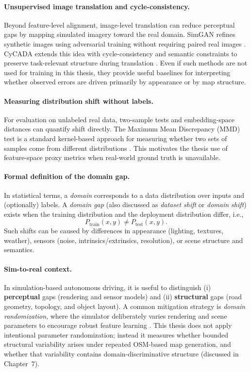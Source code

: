 \paragraph{Unsupervised image translation and cycle-consistency.}
Beyond feature-level alignment, image-level translation can reduce perceptual gaps by mapping simulated imagery toward the real domain.
SimGAN refines synthetic images using adversarial training without requiring paired real images \cite{shrivastava2017simgan}.
CyCADA extends this idea with cycle-consistency and semantic constraints to preserve task-relevant structure during translation \cite{hoffman2018cycada}.
Even if such methods are not used for training in this thesis, they provide useful baselines for interpreting whether observed errors are driven primarily by appearance or by map structure.

\paragraph{Measuring distribution shift without labels.}
For evaluation on unlabeled real data, two-sample tests and embedding-space distances can quantify shift directly.
The Maximum Mean Discrepancy (MMD) test is a standard kernel-based approach for measuring whether two sets of samples come from different distributions \citep{gretton2012mmd}.
This motivates the thesis use of feature-space proxy metrics when real-world ground truth is unavailable.


\paragraph{Formal definition of the domain gap.}
In statistical terms, a \emph{domain} corresponds to a data distribution over inputs and (optionally) labels.
A \emph{domain gap} (also discussed as \emph{dataset shift} or \emph{domain shift}) exists when the training distribution and the deployment distribution differ, i.e.,
\begin{equation}
P_{\text{train}}(x,y) \neq P_{\text{test}}(x,y).
\end{equation}
Such shifts can be caused by differences in appearance (lighting, textures, weather), sensors (noise, intrinsics/extrinsics, resolution), or scene structure and semantics. \citep{quionero2009datasetshift}

\paragraph{Sim-to-real context.}
In simulation-based autonomous driving, it is useful to distinguish (i) \textbf{perceptual} gaps (rendering and sensor models) and (ii) \textbf{structural} gaps (road geometry, topology, and object layout).
A common mitigation strategy is \emph{domain randomization}, where the simulator deliberately varies rendering and scene parameters to encourage robust feature learning \citep{tobin2017domainrandomization}.
This thesis does not apply intentional parameter randomization; instead it measures whether bounded structural variability arises under repeated OSM-based map generation, and whether that variability contains domain-discriminative structure (discussed in Chapter~7).

